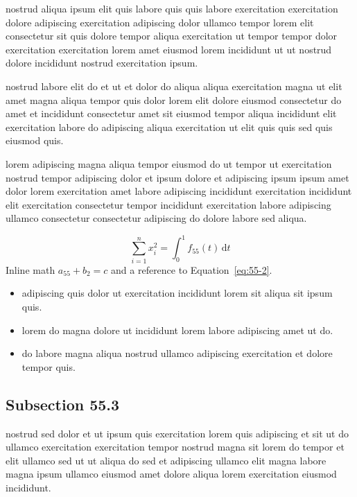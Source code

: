 \documentclass{article}
\begin{document}
nostrud aliqua ipsum elit quis labore quis quis labore exercitation exercitation dolore adipiscing exercitation adipiscing dolor ullamco tempor lorem elit consectetur sit quis dolore tempor aliqua exercitation ut tempor tempor dolor exercitation exercitation lorem amet eiusmod lorem incididunt ut ut nostrud dolore incididunt nostrud exercitation ipsum.

nostrud labore elit do et ut et dolor do aliqua aliqua exercitation magna ut elit amet magna aliqua tempor quis dolor lorem elit dolore eiusmod consectetur do amet et incididunt consectetur amet sit eiusmod tempor aliqua incididunt elit exercitation labore do adipiscing aliqua exercitation ut elit quis quis sed quis eiusmod quis.

lorem adipiscing magna aliqua tempor eiusmod do ut tempor ut exercitation nostrud tempor adipiscing dolor et ipsum dolore et adipiscing ipsum ipsum amet dolor lorem exercitation amet labore adipiscing incididunt exercitation incididunt elit exercitation consectetur tempor incididunt exercitation labore adipiscing ullamco consectetur consectetur adipiscing do dolore labore sed aliqua.

\begin{equation}\label{eq:55-2}
  \sum_{i=1}^{n} x_i^{2} = \int_0^1 f_{55}(t)\,\mathrm{d}t
\end{equation}
Inline math $a_{55} + b_{2} = c$ and a reference to Equation~\eqref{eq:55-2}.

\begin{itemize}
  \item adipiscing quis dolor ut exercitation incididunt lorem sit aliqua sit ipsum quis.
  \item lorem do magna dolore ut incididunt lorem labore adipiscing amet ut do.
  \item do labore magna aliqua nostrud ullamco adipiscing exercitation et dolore tempor quis.
\end{itemize}

\subsection{Subsection 55.3}\label{sec:55-3}
nostrud sed dolor et ut ipsum quis exercitation lorem quis adipiscing et sit ut do ullamco exercitation exercitation tempor nostrud magna sit lorem do tempor et elit ullamco sed ut ut aliqua do sed et adipiscing ullamco elit magna labore magna ipsum ullamco eiusmod amet dolore aliqua lorem exercitation eiusmod incididunt.
\end{document}
